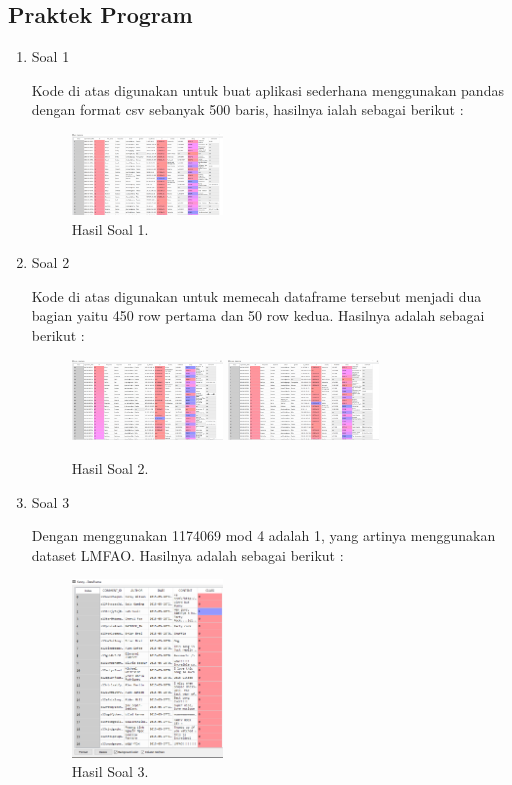 \subsection{Praktek Program}
\begin{enumerate}
	\item Soal 1
	\hfill\break
	
	Kode di atas digunakan untuk buat aplikasi sederhana menggunakan pandas dengan format csv sebanyak 500 baris, hasilnya ialah sebagai berikut : 
	\begin{figure}[H]
	\centering
		\includegraphics[width=4cm]{figures/1174071/4/materi/hasil1.PNG}
		\caption{Hasil Soal 1.}
	\end{figure}

	\item Soal 2
	\hfill\break
	
	Kode di atas digunakan untuk memecah dataframe tersebut menjadi dua bagian yaitu 450 row pertama dan 50 row kedua. Hasilnya adalah sebagai berikut :
	\begin{figure}[H]
	\centering
		\includegraphics[width=4cm]{figures/1174071/4/materi/hasil21.PNG}
		\includegraphics[width=4cm]{figures/1174071/4/materi/hasil22.PNG}
		\caption{Hasil Soal 2.}
	\end{figure}
	
	\item Soal 3
	\hfill\break
	
	Dengan menggunakan 1174069 mod 4 adalah 1, yang artinya menggunakan dataset LMFAO. Hasilnya adalah sebagai berikut :
	\begin{figure}[H]
	\centering
		\includegraphics[width=4cm]{figures/1174071/4/materi/hasil31.PNG}
		\caption{Hasil Soal 3.}
	\end{figure}


\end{enumerate}
